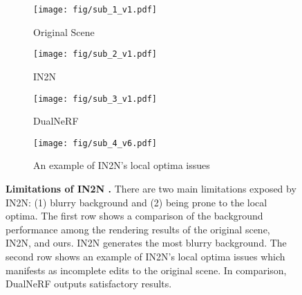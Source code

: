 \begin{figure}
    \centering

    \begin{subfigure}{0.31\linewidth}
        \begin{minipage}[t]{1.0\linewidth}
            \centering
            \texttt{[image: fig/sub\_1\_v1.pdf]}
            \caption{Original Scene}
            \label{fig: 1-original}
        \end{minipage}
    \end{subfigure}
    \hfill
    \begin{subfigure}{0.31\linewidth}
        \begin{minipage}[t]{1.0\linewidth}
            \centering
            \texttt{[image: fig/sub\_2\_v1.pdf]}
            \caption{IN2N}
            \label{fig: 1-IN2N}
        \end{minipage}
    \end{subfigure}
    \hfill
    \begin{subfigure}{0.31\linewidth}
        \begin{minipage}[t]{1.0\linewidth}
            \centering
            \texttt{[image: fig/sub\_3\_v1.pdf]}
            \caption{DualNeRF}
            \label{fig: 1-DualNeRF}
        \end{minipage}
    \end{subfigure}

    \begin{subfigure}{0.95\linewidth}
        \begin{minipage}[t]{1.0\linewidth}
            \centering
            \texttt{[image: fig/sub\_4\_v6.pdf]}
            \caption{An example of IN2N's local optima issues}
            \label{fig: 4-local_optima}
        \end{minipage}
    \end{subfigure}
  
    \caption{\textbf{Limitations of IN2N \cite{haque2023instruct}.} There are two main limitations exposed by IN2N: (1) blurry background and (2) being prone to the local optima. The first row shows a comparison of the background performance among the rendering results of the original scene, IN2N, and ours. IN2N generates the most blurry background. The second row shows an example of IN2N's local optima issues which manifests as incomplete edits to the original scene. In comparison, DualNeRF outputs satisfactory results.}
    \label{fig: IN2N_drawbacks}
\end{figure}

